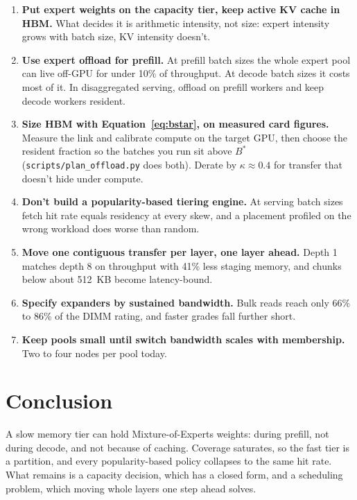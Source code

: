 \documentclass[10pt,a4paper]{article}
\begin{document}
\begin{enumerate}[leftmargin=*]
\item \textbf{Put expert weights on the capacity tier, keep active KV cache in HBM.}
      What decides it is arithmetic intensity, not size: expert intensity grows
      with batch size, KV intensity doesn't.
\item \textbf{Use expert offload for prefill.} At prefill batch sizes the whole
      expert pool can live off-GPU for under 10\% of throughput. At decode batch
      sizes it costs most of it. In disaggregated serving, offload on prefill
      workers and keep decode workers resident.
\item \textbf{Size HBM with Equation~\ref{eq:bstar}, on measured card figures.}
      Measure the link and calibrate compute on the target GPU, then choose the
      resident fraction so the batches you run sit above $B^{*}$
      (\texttt{scripts/plan\_offload.py} does both). Derate by
      $\kappa \approx 0.4$ for transfer that doesn't hide under compute.
\item \textbf{Don't build a popularity-based tiering engine.} At serving batch
      sizes fetch hit rate equals residency at every skew, and a placement
      profiled on the wrong workload does worse than random.
\item \textbf{Move one contiguous transfer per layer, one layer ahead.} Depth 1
      matches depth 8 on throughput with 41\% less staging memory, and chunks
      below about 512~KB become latency-bound.
\item \textbf{Specify expanders by sustained bandwidth.} Bulk reads reach only
      66\% to 86\% of the DIMM rating, and faster grades fall further short.
\item \textbf{Keep pools small until switch bandwidth scales with membership.}
      Two to four nodes per pool today.
\end{enumerate}

\section{Conclusion}

A slow memory tier can hold Mixture-of-Experts weights: during prefill, not during
decode, and not because of caching. Coverage saturates, so the fast tier is a
partition, and every popularity-based policy collapses to the same hit rate. What
remains is a capacity decision, which has a closed form, and a scheduling problem,
which moving whole layers one step ahead solves.
\end{document}
